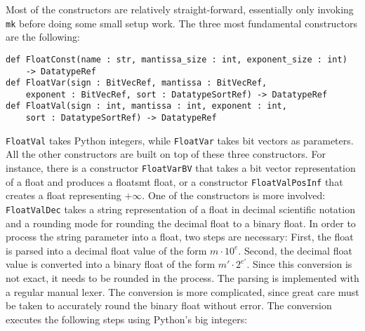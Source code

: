 \documentclass[a4paper,UKenglish,cleveref, autoref, thm-restate]{lipics-v2019}
\begin{document}
Most of the constructors are relatively straight-forward, essentially only invoking \verb|mk| before doing some small setup work. The three most fundamental constructors are the following:
\begin{lstlisting}
def FloatConst(name : str, mantissa_size : int, exponent_size : int) 
    -> DatatypeRef
def FloatVar(sign : BitVecRef, mantissa : BitVecRef, 
    exponent : BitVecRef, sort : DatatypeSortRef) -> DatatypeRef
def FloatVal(sign : int, mantissa : int, exponent : int, 
    sort : DatatypeSortRef) -> DatatypeRef
\end{lstlisting}
\verb|FloatVal| takes Python integers, while \verb|FloatVar| takes bit vectors as parameters.
All the other constructors are built on top of these three constructors. For instance, there is a constructor \verb|FloatVarBV| that takes a bit vector representation of a float and produces a floatsmt float, or a constructor \verb|FloatValPosInf| that creates a float representing $+\infty$.
One of the constructors is more involved: \verb|FloatValDec| takes a string representation of a float in decimal scientific notation and a rounding mode for rounding the decimal float to a binary float. In order to process the string parameter into a float, two steps are necessary: First, the float is parsed into a decimal float value of the form $m \cdot 10^e$. Second, the decimal float value is converted into a binary float of the form $m' \cdot 2^{e'}$. Since this conversion is not exact, it needs to be rounded in the process. The parsing is implemented with a regular manual lexer. The conversion is more complicated, since great care must be taken to accurately round the binary float without error. The conversion executes the following steps using Python's big integers:
\end{document}

